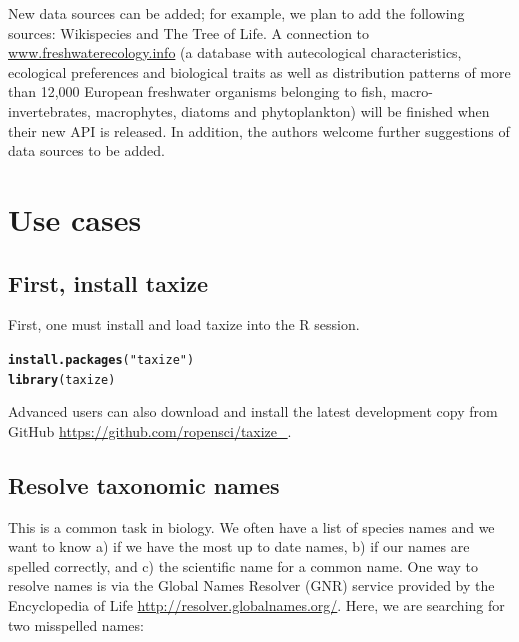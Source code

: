 \documentclass[10pt,a4paper,twocolumn]{article}
\makeatletter
\newcommand{\hlfunctioncall}[1]{\textcolor[rgb]{0.501960784313725,0,0.329411764705882}{\textbf{#1}}}%
\newcommand{\hlstring}[1]{\textcolor[rgb]{0.6,0.6,1}{#1}}%
\newenvironment{kframe}{%
 \def\at@end@of@kframe{}%
 \ifinner\ifhmode%
  \def\at@end@of@kframe{\end{minipage}}%
  \begin{minipage}{\columnwidth}%
 \fi\fi%
 \def\FrameCommand##1{\hskip\@totalleftmargin \hskip-\fboxsep
 \colorbox{shadecolor}{##1}\hskip-\fboxsep
     \hskip-\linewidth \hskip-\@totalleftmargin \hskip\columnwidth}%
 \MakeFramed {\advance\hsize-\width
   \@totalleftmargin\z@ \linewidth\hsize
   \@setminipage}}%
 {\par\unskip\endMakeFramed%
 \at@end@of@kframe}
\newenvironment{knitrout}{}{} %
\makeatother
\begin{document}
New data sources can be added; for example, we plan to add the following sources: Wikispecies and The Tree of Life. A connection to \url{www.freshwaterecology.info} (a database with autecological characteristics, ecological preferences and biological traits as well as distribution patterns of more than 12,000 European freshwater organisms belonging to fish, macro-invertebrates, macrophytes, diatoms and phytoplankton) will be finished when their new API is released. In addition, the authors welcome further suggestions of data sources to be added.


\section*{Use cases}


\subsection*{First, install taxize}

First, one must install and load taxize into the R session.

\begin{knitrout}
\begin{scriptsize}
\color{fgcolor}\begin{kframe}
\begin{alltt}
\hlfunctioncall{install.packages}(\hlstring{"taxize"})
\hlfunctioncall{library}(taxize)
\end{alltt}
\end{kframe}
\end{scriptsize}
\end{knitrout}


Advanced users can also download and install the latest development copy from GitHub \url{https://github.com/ropensci/taxize_}.



\subsection*{Resolve taxonomic names}

This is a common task in biology. We often have a list of species names and we want to know a) if we have the most up to date names, b) if our names are spelled correctly, and c) the scientific name for a common name. One way to resolve names is via the Global Names Resolver (GNR) service provided by the Encyclopedia of Life \url{http://resolver.globalnames.org/}. Here, we are searching for two misspelled names:
\end{document}
